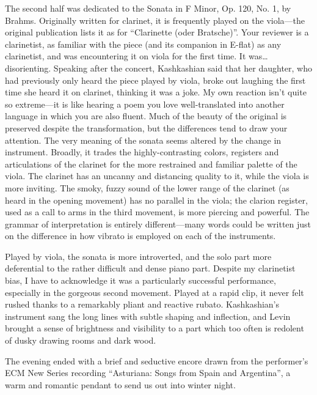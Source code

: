 The second half was dedicated to the Sonata in F Minor, Op. 120, No. 1, by Brahms. Originally written for clarinet, it is frequently played on the viola—the original publication lists it as for “Clarinette (oder Bratsche)”. Your reviewer is a clarinetist, as familiar with the piece (and its companion in E-flat) as any clarinetist, and was encountering it on viola for the first time. It was… disorienting. Speaking after the concert, Kashkashian said that her daughter, who had previously only heard the piece played by viola, broke out laughing the first time she heard it on clarinet, thinking it was a joke. My own reaction isn’t quite so extreme—it is like hearing a poem you love well-translated into another language in which you are also fluent. Much of the beauty of the original is preserved despite the transformation, but the differences tend to draw your attention. The very meaning of the sonata seems altered by the change in instrument. Broadly, it trades the highly-contrasting colors, registers and articulations of the clarinet for the more restrained and familiar palette of the viola. The clarinet has an uncanny and distancing quality to it, while the viola is more inviting. The smoky, fuzzy sound of the lower range of the clarinet (as heard in the opening movement) has no parallel in the viola; the clarion register, used as a call to arms in the third movement, is more piercing and powerful. The grammar of interpretation is entirely different—many words could be written just on the difference in how vibrato is employed on each of the instruments.

Played by viola, the sonata is more introverted, and the solo part more deferential to the rather difficult and dense piano part. Despite my clarinetist bias, I have to acknowledge it was a particularly successful performance, especially in the gorgeous second movement. Played at a rapid clip, it never felt rushed thanks to a remarkably pliant and reactive rubato. Kashkashian’s instrument sang the long lines with subtle shaping and inflection, and Levin brought a sense of brightness and visibility to a part which too often is redolent of dusky drawing rooms and dark wood.

The evening ended with a brief and seductive encore drawn from the performer’s ECM New Series recording “Asturiana: Songs from Spain and Argentina”, a warm and romantic pendant to send us out into winter night.
